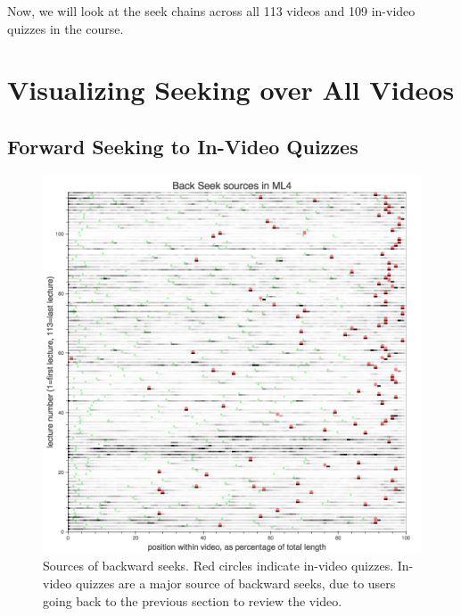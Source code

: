 \documentclass{sigchi}
\begin{document}

Now, we will look at the seek chains across all 113 videos and 109 in-video quizzes in the course.

\pagebreak

\section{Visualizing Seeking over All Videos}

\subsection{Forward Seeking to In-Video Quizzes}

\begin{figure}
\includegraphics[width=1.0\columnwidth]{back-seek-sources-allvideos}
\caption{Sources of backward seeks. Red circles indicate in-video quizzes. In-video quizzes are a major source of backward seeks, due to users going back to the previous section to review the video.}
\label{fig:back-seek-sources-allvideos}
\end{figure}
\end{document}
